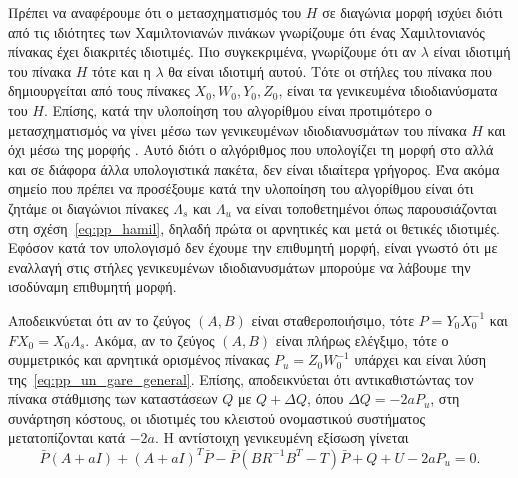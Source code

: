 Πρέπει να αναφέρουμε ότι ο μετασχηματισμός του \( H \) σε διαγώνια μορφή ισχύει
διότι από τις ιδιότητες των Χαμιλτονιανών πινάκων γνωρίζουμε ότι ένας
Χαμιλτονιανός πίνακας έχει διακριτές ιδιοτιμές. Πιο συγκεκριμένα, γνωρίζουμε
ότι αν \( \lambda \) είναι ιδιοτιμή του πίνακα \( H \) τότε και η \( \lambda \)
θα είναι ιδιοτιμή αυτού. Τότε οι στήλες του πίνακα που δημιουργείται από τους
πίνακες \( X_0, W_0, Y_0, Z_0 \), είναι τα γενικευμένα ιδιοδιανύσματα του \( H
\). Επίσης, κατά την υλοποίηση του αλγορίθμου είναι προτιμότερο ο
μετασχηματισμός να γίνει μέσω των γενικευμένων ιδιοδιανυσμάτων του πίνακα \( H
\) και όχι μέσω της μορφής . Αυτό διότι ο αλγόριθμος που υπολογίζει
τη μορφή  στο  αλλά και σε διάφορα άλλα υπολογιστικά
πακέτα, δεν είναι ιδιαίτερα γρήγορος.  Ένα ακόμα σημείο που πρέπει να
προσέξουμε κατά την υλοποίηση του αλγορίθμου είναι ότι ζητάμε οι διαγώνιοι
πίνακες \( \Lambda_s \) και \( \Lambda_u \) να είναι τοποθετημένοι όπως
παρουσιάζονται στη σχέση~\eqref{eq:pp_hamil}, δηλαδή πρώτα οι αρνητικές και
μετά οι θετικές ιδιοτιμές. Εφόσον κατά τον υπολογισμό δεν έχουμε την επιθυμητή
μορφή, είναι γνωστό ότι με εναλλαγή στις στήλες γενικευμένων ιδιοδιανυσμάτων
μπορούμε να λάβουμε την ισοδύναμη επιθυμητή μορφή.

Αποδεικνύεται ότι αν το ζεύγος \( (A, B) \) είναι σταθεροποιήσιμο, τότε \( P =
Y_0 X_0^{-1} \) και \( FX_0 = X_0\Lambda_s \). Ακόμα, αν το ζεύγος \( (A, B) \)
είναι πλήρως ελέγξιμο, τότε ο συμμετρικός και αρνητικά ορισμένος πίνακας \( P_u
= Z_0 W_0^{-1} \) υπάρχει και είναι λύση της~\eqref{eq:pp_un_gare_general}.
Επίσης, αποδεικνύεται ότι αντικαθιστώντας τον πίνακα στάθμισης των καταστάσεων
\( Q \) με \( Q + \Delta Q \), όπου \( \Delta Q = - 2aP_u \), στη συνάρτηση
κόστους, οι ιδιοτιμές του κλειστού ονομαστικού συστήματος μετατοπίζονται κατά
\( -2a \).  Η αντίστοιχη γενικευμένη εξίσωση  γίνεται
\begin{equation}\label{eq:pp_un_gare_a}
    \bar{P}(A + aI) + (A + aI)^{T}\bar{P} - \bar{P}(BR^{-1}B^{T} - T)\bar{P} +
    Q + U - 2aP_u= 0.
\end{equation}

